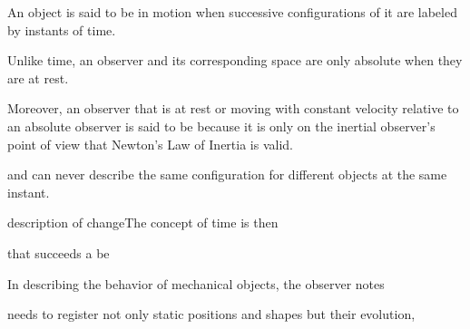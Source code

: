 An object is said to be in motion when successive configurations of it are labeled by instants of time. 


Unlike time, an observer and its corresponding space are only absolute when they are at rest.   




Moreover, an observer that is at rest or moving with constant velocity relative to an absolute observer is said to be  because it is only on the inertial observer's point of view that Newton's Law of Inertia is valid.


 




and can never describe the same configuration for different objects at the same instant.   


description of changeThe concept of time is then  


 that succeeds a be   


In describing the behavior of mechanical objects, the observer notes 

needs to register not only static positions and shapes but their evolution,  






